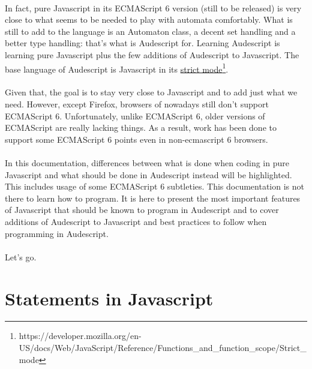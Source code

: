 \documentclass{article}
\begin{document}
\begin{sloppypar}
   
\paragraph{}
In fact, pure Javascript in its ECMAScript 6 version (still to be released) is very close to what seems to be needed to play with automata comfortably. What is still to add to the language is an Automaton class, a decent set handling and a better type handling: that's what is Audescript for. Learning Audescript is learning pure Javascript plus the few additions of Audescript to Javascript. The base language of Audescript is Javascript in its \href{https://developer.mozilla.org/en-US/docs/Web/JavaScript/Reference/Functions_and_function_scope/Strict_mode}{strict mode}\footnote{https://developer.mozilla.org/en-US/docs/Web/JavaScript/Reference/Functions\_and\_function\_scope/Strict\_mode}.

   
\paragraph{}
Given that, the goal is to stay very close to Javascript and to add just what we need. However, except Firefox, browsers of nowadays still don't support ECMAScript 6. Unfortunately, unlike ECMAScript 6, older versions of ECMAScript are really lacking things. As a result, work has been done to support some ECMAScript 6 points even in non-ecmascript 6 browsers.

   
\paragraph{}
In this documentation, differences between what is done when coding in pure Javascript and what should be done in Audescript instead will be highlighted. This includes usage of some ECMAScript 6 subtleties. This documentation is not there to learn how to program. It is here to present the most important features of Javascript that should be known to program in Audescript and to cover additions of Audescript to Javascript and best practices to follow when programming in Audescript.

   
\paragraph{}
Let's go.



\newpage



\section{ Statements in Javascript}



\end{sloppypar}
\end{document}
